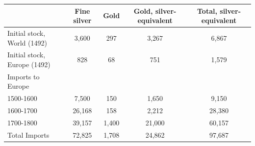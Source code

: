 
\begin{table}[htbp]
  \centering
 
    \begin{tabular}{lcccc}
    \multicolumn{1}{r}{} & \multicolumn{1}{c}{Fine silver} & Gold & Gold, silver-equivalent & Total, silver-equivalent \\
    \midrule
    Initial stock, World (1492) & 3,600 & 297 & 3,267 & 6,867\\
    Initial stock, Europe (1492) & 828 & 68 & 751 & 1,579 \\
 \midrule
    Imports to Europe & &  \\
    \phantom{okay}1500-1600 & 7,500 & 150 & 1,650 & 9,150\\
     \phantom{okay}1600-1700 & 26,168 & 158& 2,212 & 28,380 \\
    	 \phantom{okay}1700-1800 & 39,157 & 1,400 & 21,000 & 60,157\\
 \midrule
   Total Imports & 72,825 & 1,708 & 24,862 & 97,687\\
    \midrule
    \end{tabular}%

\end{table}%
